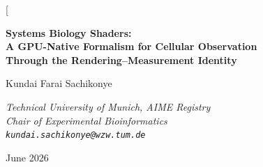 \documentclass[11pt,twocolumn,a4paper]{article}
\begin{document}
\twocolumn[
\begin{@twocolumnfalse}
\begin{center}

{\LARGE\bfseries Systems Biology Shaders:\\[4pt]
A GPU-Native Formalism for Cellular Observation\\[4pt]
Through the Rendering--Measurement Identity}

\vspace{12pt}

{\large Kundai Farai Sachikonye}

\vspace{6pt}

{\small\itshape Technical University of Munich, AIME Registry\\[0.3em]
Chair of Experimental Bioinformatics\\[0.3em]
\texttt{kundai.sachikonye@wzw.tum.de}}

\vspace{6pt}

{\small June 2026}

\vspace{14pt}


\end{center}
\end{@twocolumnfalse}
\end{document}
